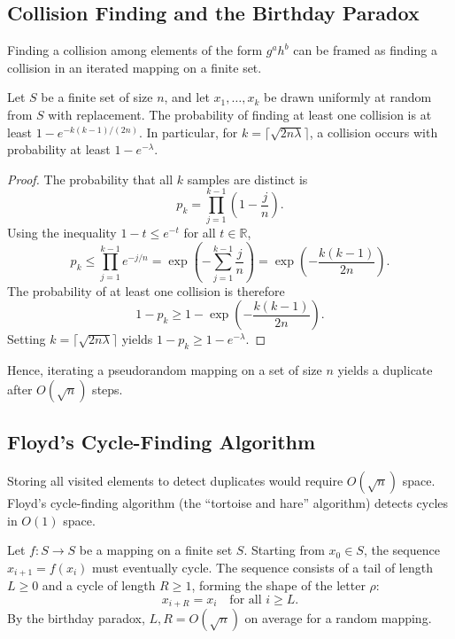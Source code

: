 \subsection*{Collision Finding and the Birthday Paradox}

Finding a collision among elements of the form \(g^a h^b\) can be framed as finding a collision in an iterated mapping on a finite set.

\begin{lemma}\label{lem:birthday-collision}
    Let \(S\) be a finite set of size \(n\), and let \(x_1, \dots, x_k\) be drawn uniformly at random from \(S\) with replacement.
    The probability of finding at least one collision is at least \(1 - e^{-k(k-1)/(2n)}\).
    In particular, for \(k = \lceil \sqrt{2n\lambda} \rceil\), a collision occurs with probability at least \(1 - e^{-\lambda}\).
\end{lemma}

\begin{proof}
    The probability that all \(k\) samples are distinct is
    \[
        p_k = \prod_{j=1}^{k-1} \left( 1 - \frac{j}{n} \right).
    \]
    Using the inequality \(1 - t \leq e^{-t}\) for all \(t \in \mathbb{R}\),
    \[
        p_k \leq \prod_{j=1}^{k-1} e^{-j/n} = \exp\left( -\sum_{j=1}^{k-1} \frac{j}{n} \right) = \exp\left( -\frac{k(k-1)}{2n} \right).
    \]
    The probability of at least one collision is therefore
    \[
        1 - p_k \geq 1 - \exp\left( -\frac{k(k-1)}{2n} \right).
    \]
    Setting \(k = \lceil \sqrt{2n\lambda} \rceil\) yields \(1 - p_k \geq 1 - e^{-\lambda}\).
\end{proof}

Hence, iterating a pseudorandom mapping on a set of size \(n\) yields a duplicate after \(O(\sqrt{n})\) steps.

\subsection*{Floyd's Cycle-Finding Algorithm}

Storing all visited elements to detect duplicates would require \(O(\sqrt{n})\) space.
Floyd's cycle-finding algorithm (the ``tortoise and hare'' algorithm) detects cycles in \(O(1)\) space.

Let \(f \colon S \to S\) be a mapping on a finite set \(S\).
Starting from \(x_0 \in S\), the sequence \(x_{i+1} = f(x_i)\) must eventually cycle.
The sequence consists of a tail of length \(L \geq 0\) and a cycle of length \(R \geq 1\), forming the shape of the letter \(\rho\):
\[
    x_{i+R} = x_i \quad \text{for all } i \geq L.
\]
By the birthday paradox, \(L, R = O(\sqrt{n})\) on average for a random mapping.

